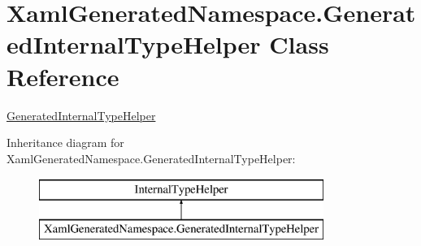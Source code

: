 \hypertarget{class_xaml_generated_namespace_1_1_generated_internal_type_helper}{}\section{Xaml\+Generated\+Namespace.\+Generated\+Internal\+Type\+Helper Class Reference}
\label{class_xaml_generated_namespace_1_1_generated_internal_type_helper}


\mbox{\hyperlink{class_xaml_generated_namespace_1_1_generated_internal_type_helper}{Generated\+Internal\+Type\+Helper}}  


Inheritance diagram for Xaml\+Generated\+Namespace.\+Generated\+Internal\+Type\+Helper\+:\begin{figure}[H]
\begin{center}
\leavevmode
\includegraphics[height=2.000000cm]{class_xaml_generated_namespace_1_1_generated_internal_type_helper}
\end{center}
\end{figure}
